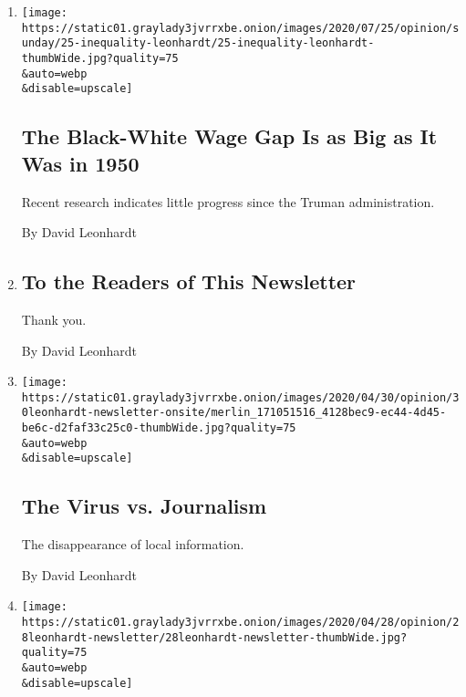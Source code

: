 \begin{enumerate}
\def\labelenumi{\arabic{enumi}.}
\item
  \href{/2020/06/25/opinion/sunday/race-wage-gap.html}{}

  \texttt{[image: https://static01.graylady3jvrrxbe.onion/images/2020/07/25/opinion/sunday/25-inequality-leonhardt/25-inequality-leonhardt-thumbWide.jpg?quality=75\\\&auto=webp\\\&disable=upscale]}

  \hypertarget{the-black-white-wage-gap-is-as-big-as-it-was-in-1950}{%
  \subsection{The Black-White Wage Gap Is as Big as It Was in
  1950}\label{the-black-white-wage-gap-is-as-big-as-it-was-in-1950}}

  Recent research indicates little progress since the Truman
  administration.

  By David Leonhardt
\item
  \href{/2020/05/01/opinion/david-leonhardt-newsletter.html}{}

  \hypertarget{to-the-readers-of-this-newsletter}{%
  \subsection{To the Readers of This
  Newsletter}\label{to-the-readers-of-this-newsletter}}

  Thank you.

  By David Leonhardt
\item
  \href{/2020/04/30/opinion/journalists-newspapers-coronavirus.html}{}

  \texttt{[image: https://static01.graylady3jvrrxbe.onion/images/2020/04/30/opinion/30leonhardt-newsletter-onsite/merlin\_171051516\_4128bec9-ec44-4d45-be6c-d2faf33c25c0-thumbWide.jpg?quality=75\\\&auto=webp\\\&disable=upscale]}

  \hypertarget{the-virus-vs-journalism}{%
  \subsection{The Virus vs. Journalism}\label{the-virus-vs-journalism}}

  The disappearance of local information.

  By David Leonhardt
\item
  \href{/2020/04/28/opinion/coronavirus-testing-united-states.html}{}

  \texttt{[image: https://static01.graylady3jvrrxbe.onion/images/2020/04/28/opinion/28leonhardt-newsletter/28leonhardt-newsletter-thumbWide.jpg?quality=75\\\&auto=webp\\\&disable=upscale]}


\end{enumerate}
